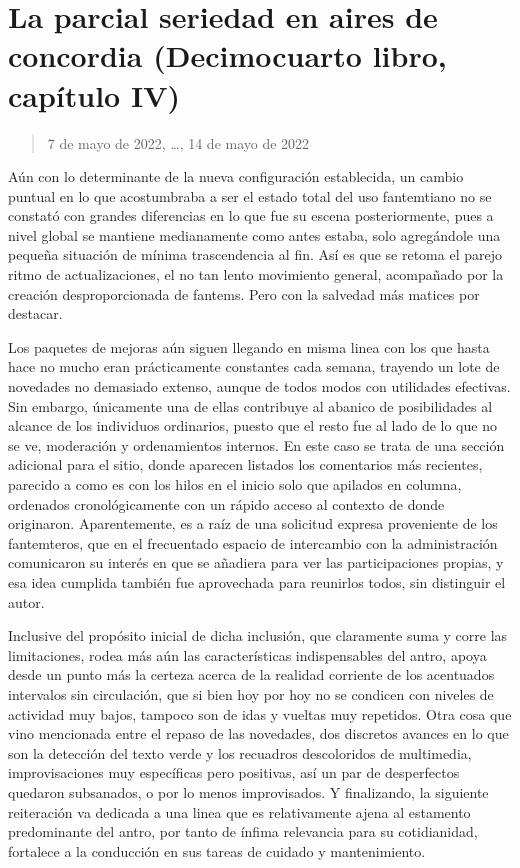 \documentclass[
]{book}
\begin{document}
\hypertarget{la-parcial-seriedad-en-aires-de-concordia-decimocuarto-libro-capuxedtulo-iv}{%
\section{La parcial seriedad en aires de concordia (Decimocuarto libro, capítulo IV)}\label{la-parcial-seriedad-en-aires-de-concordia-decimocuarto-libro-capuxedtulo-iv}}

\begin{quote}
7 de mayo de 2022, \ldots, 14 de mayo de 2022
\end{quote}

Aún con lo determinante de la nueva configuración establecida, un cambio puntual en lo que acostumbraba a ser el estado total del uso fantemtiano no se constató con grandes diferencias en lo que fue su escena posteriormente, pues a nivel global se mantiene medianamente como antes estaba, solo agregándole una pequeña situación de mínima trascendencia al fin. Así es que se retoma el parejo ritmo de actualizaciones, el no tan lento movimiento general, acompañado por la creación desproporcionada de fantems. Pero con la salvedad más matices por destacar.

Los paquetes de mejoras aún siguen llegando en misma linea con los que hasta hace no mucho eran prácticamente constantes cada semana, trayendo un lote de novedades no demasiado extenso, aunque de todos modos con utilidades efectivas. Sin embargo, únicamente una de ellas contribuye al abanico de posibilidades al alcance de los individuos ordinarios, puesto que el resto fue al lado de lo que no se ve, moderación y ordenamientos internos. En este caso se trata de una sección adicional para el sitio, donde aparecen listados los comentarios más recientes, parecido a como es con los hilos en el inicio solo que apilados en columna, ordenados cronológicamente con un rápido acceso al contexto de donde originaron. Aparentemente, es a raíz de una solicitud expresa proveniente de los fantemteros, que en el frecuentado espacio de intercambio con la administración comunicaron su interés en que se añadiera para ver las participaciones propias, y esa idea cumplida también fue aprovechada para reunirlos todos, sin distinguir el autor.

Inclusive del propósito inicial de dicha inclusión, que claramente suma y corre las limitaciones, rodea más aún las características indispensables del antro, apoya desde un punto más la certeza acerca de la realidad corriente de los acentuados intervalos sin circulación, que si bien hoy por hoy no se condicen con niveles de actividad muy bajos, tampoco son de idas y vueltas muy repetidos. Otra cosa que vino mencionada entre el repaso de las novedades, dos discretos avances en lo que son la detección del texto verde y los recuadros descoloridos de multimedia, improvisaciones muy específicas pero positivas, así un par de desperfectos quedaron subsanados, o por lo menos improvisados. Y finalizando, la siguiente reiteración va dedicada a una linea que es relativamente ajena al estamento predominante del antro, por tanto de ínfima relevancia para su cotidianidad, fortalece a la conducción en sus tareas de cuidado y mantenimiento.
\end{document}
